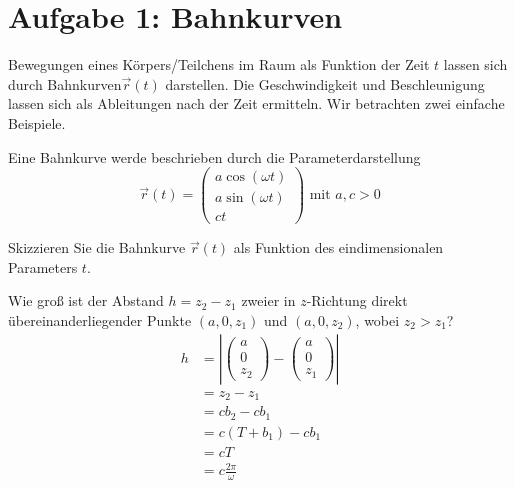   
  

	\section*{Aufgabe 1:  Bahnkurven}
	Bewegungen  eines  Körpers/Teilchens  im  Raum  als  Funktion  der Zeit $t$ lassen  sich durch Bahnkurven$\overrightarrow{r}(t)$ darstellen. Die Geschwindigkeit und Beschleunigung lassen sich als Ableitungen nach der Zeit ermitteln. Wir betrachten zwei einfache Beispiele.
	\begin{enumeralph}
		\item Eine Bahnkurve werde beschrieben durch die Parameterdarstellung \[\overrightarrow{r}(t)=\begin{pmatrix}
		a\cos(\omega t)\\
		a\sin(\omega t)\\
		ct
		\end{pmatrix} \text{ mit } a, c > 0\]
		\begin{enumeroman}
			\item Skizzieren Sie die Bahnkurve $\overrightarrow{r}(t)$ als Funktion des eindimensionalen Parameters $t$.\\
			\item Wie groß ist der Abstand $h=z_2 - z_1$ zweier in $z$-Richtung direkt übereinanderliegender Punkte $(a,0,z_1)$ und $(a,0,z_2)$, wobei $z_2 > z_1$?
			\begin{align*}
			h&=\left|\begin{pmatrix}a\\0\\z_2\end{pmatrix} - \begin{pmatrix}a\\0\\z_1\end{pmatrix}\right|\\
			&=z_2 - z_1\\
			&=cb_2 - cb_1\\
			&=c(T + b_1) - cb_1\\
			&=cT\\
			&=c\frac{2\pi}{\omega}

\end{align*}
\end{enumeroman}
\end{enumeralph}
